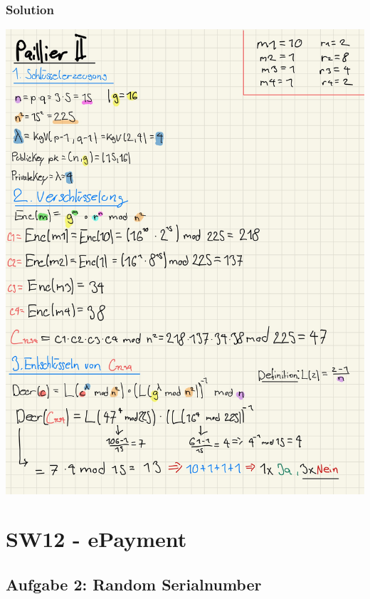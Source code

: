 \documentclass[11pt]{article}
\begin{document}
\hypertarget{solution}{%
\subsubsection{Solution}\label{solution}}

\begin{center}
	\includegraphics[scale=0.9]{img/pail2_sw11.jpg}
\end{center}
    

    \hypertarget{sw12---epayment}{%
\section{SW12 - ePayment}\label{sw12---epayment}}

    \hypertarget{aufgabe-2-random-serialnumber}{%
\subsection{Aufgabe 2: Random
Serialnumber}\label{aufgabe-2-random-serialnumber}}
\end{document}
